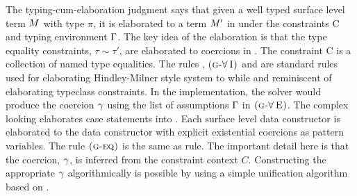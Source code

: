 \documentclass[manuscript,screen,nonacm]{acmart}
\begin{document}
\newcommand\GADTVar{
 \ib{\irule[\trule{g-var}]
 {x\co\pi \in \TEnv};
 {\GTranslate C \TEnv x {\pi} x}
 }
}
\newcommand\GADTEq{
 \ib{\irule[\trule{g-eq}]
 {\GTranslate C \TEnv \Tm \tau \Tm'}
 {\CoKinding C \Co {\tau \sim \tau'}};
 {\GTranslate C \TEnv \Tm {\tau'} {\Cast {\Tm'} \Co}}
 }
}
\newcommand\GADTForallI{
 \ib{\irule[\trule{g-$\I\forall$}]
 {\GTranslate C \TEnv \Tm \pi \Tm'}
 {\fresh \TyVar {C, \TEnv}};
 {\GTranslate C \TEnv \Tm {\Forall {\TyVar\co\star} \pi} {\TLam {\TyVar\co\star} \Tm'}}
 }
}
\newcommand\GADTForallE{
 \ib{\irule[\trule{g-$\E\forall$}]
 {\GTranslate C \TEnv \Tm {\Forall {\TyVar\co\star} \pi} \Tm'};
 {\GTranslate C \TEnv \Tm {\Set{\TyVar\mapsto\tau}\pi} {\Tm'\App \tau}}
 }
}
\newcommand\GADTCI{
 \ib{\irule[\trule{g-$\I C$}]
 {\GTranslate {C,c:\tau\sim\tau'} \TEnv \Tm {\eta} \Tm'};
 {\GTranslate C \TEnv \Tm {\tau\sim\tau'\then\eta} {\TLam {(c\co\tau\sim\tau')} \Tm'}}
 }
}
\newcommand\GADTCE{
 \ib{\irule[\trule{g-$\E C$}]
 {\GTranslate {C} \TEnv \Tm {\tau\sim\tau'\then\eta} \Tm'}
 {\CoKinding C \Co \tau\sim\tau'};
 {\GTranslate C \TEnv \Tm {\eta} {\Tm'\App\Co}}
 }
}
\newcommand\GADTAlt{
 \ib{\irule[\trule{g-alt}]
 {\substack{
 \mathlarger{H\co \Forall {\many\TyVar} {\Forall {\many\beta} {\many{\tau'\sim\tau''} \then \many\tau \to T\many\TyVar}}}\quad
 \mathlarger{\many\TyVar \cap \many\beta = \varnothing}\quad
 \mathlarger{\fvs{\many\tau, \many{\tau'}, \many{\tau''}} = \fvs{\many\TyVar, \many\beta}}\quad
 \mathlarger{\Subst = \Set{\many{\TyVar\mapsto v}}}\quad
 \mathlarger{\fresh {\many{c}} {C, \TEnv}}\\
 \mathlarger{\GTranslate {C,\many{c\co\Subst{\tau'}\sim\Subst\tau''}\,} {\,\TEnv,\many{x\co\Subst\tau}\,} \Tm {\tau'} \Tm'} }};
 {\GTranslate C \TEnv {H\App\many x \to \Tm} {T\App\many v \to \tau'}
 {H\App(\many{\beta\co\star})\App(\many{c\co\Subst\tau'\sim\Subst\tau''})\App(\many{x\co\Subst\tau}) \to \Tm' }}
 }
}


The typing-cum-elaboration  judgment  says that given a well typed surface level term $M$ with type $\pi$, it is elaborated to a term $M'$ in \SFC under the constraints C and typing environment $\Gamma$. The key idea of the elaboration is that the type equality constraints, $\tau\sim\tau'$, are elaborated to coercions in \SFC. The constraint C is a collection of named type equalities. The rules , $\textsc{(g-\ensuremath{\mathord{\forall}}\!~I)}$ and  are standard rules used for elaborating Hindley-Milner style system\cite{TODO} to \SF while  and  reminiscent of elaborating typeclass constraints. In the implementation, the solver would produce the coercion $\gamma$ using the list of assumptions $\Gamma$ in $\textsc{(g-\ensuremath{\mathord{\forall}}\!~E)}$. The complex looking  elaborates case statements into \SFC. Each surface level data constructor is elaborated to the \SFC data constructor with explicit existential coercions as pattern variables. The rule $\textsc{(g-eq)}$ is the same as  rule. The important detail here is that the coercion, $\gamma$, is inferred from the constraint context $C$. Constructing the appropriate $\gamma$ algorithmically is possible by using a simple unification algorithm based on \cite{lassez_unification_1988}.
\end{document}
